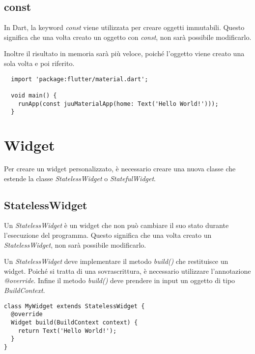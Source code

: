 \documentclass[12pt]{article}
\begin{document}
\subsection{const}
In Dart, la keyword \textit{const} viene utilizzata per creare
oggetti immutabili. Questo significa che una volta creato un oggetto con \textit{const}, non sarà possibile modificarlo.

Inoltre il risultato in memoria sarà più veloce, poiché l'oggetto
viene creato una sola volta e poi riferito.

\begin{verbatim}
  import 'package:flutter/material.dart';
  
  void main() {
    runApp(const juuMaterialApp(home: Text('Hello World!')));
  }
\end{verbatim}

\section{Widget}
Per creare un widget personalizzato, è necessario creare una nuova classe
che estende la classe \textit{StatelessWidget} o \textit{StatefulWidget}.

\subsection{StatelessWidget}
Un \textit{StatelessWidget} è un widget che non può cambiare il suo stato
durante l'esecuzione del programma. Questo significa che una volta creato
un \textit{StatelessWidget}, non sarà possibile modificarlo.

Un \textit{StatelessWidget} deve implementare il metodo \textit{build()} che
restituisce un widget. Poiché si tratta di 
una sovrascrittura, è necessario utilizzare l'annotazione \textit{@override}. Infine 
il metodo \textit{build()} deve prendere in input un oggetto di tipo \textit{BuildContext}.
\begin{verbatim}
class MyWidget extends StatelessWidget {
  @override
  Widget build(BuildContext context) {
    return Text('Hello World!');
  }
}
\end{verbatim}
\end{document}
